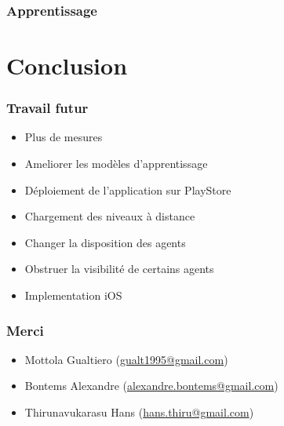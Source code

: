 \documentclass{beamer}
\begin{document}
\begin{frame}
\frametitle{Apprentissage}
\end{frame}

\section{Conclusion}

\begin{frame}
\frametitle{Travail futur}
 \begin{itemize}
 	\item Plus de mesures 
    \item Ameliorer les modèles d'apprentissage  
   	\item Déploiement de l'application sur PlayStore
   	\item Chargement des niveaux à distance
    \item Changer la disposition des agents
  	\item Obstruer la visibilité de certains agents
  	\item Implementation iOS 
\end{itemize}
\end{frame}


\begin{frame}
\frametitle{Merci}
 \begin{itemize}
   \item Mottola Gualtiero (\url{gualt1995@gmail.com})
   \item Bontems Alexandre (\url{alexandre.bontems@gmail.com})
   \item Thirunavukarasu Hans (\url{hans.thiru@gmail.com})
\end{itemize}
\end{frame}
\end{document}
